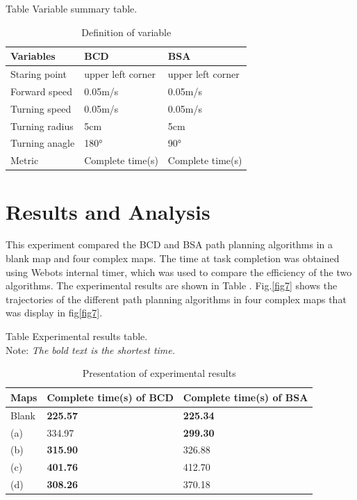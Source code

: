 \documentclass[conference]{IEEEtran}
\begin{document}
Table \uppercase\expandafter{} Variable summary table.
\begin{table}[htbp]
\centering
\setlength{\abovecaptionskip}{0.cm}
\caption{Definition of variable}
\label{Table1}
\begin{tabular}{lll}
\hline
Variables      & BCD               & BSA               \\\hline
Staring point  & upper left corner & upper left corner \\
Forward speed  & 0.05m/s           & 0.05m/s           \\
Turning speed  & 0.05m/s           & 0.05m/s           \\
Turning radius & 5cm               & 5cm               \\
Turning anagle & 180°              & 90°               \\
Metric         & Complete time(s)  & Complete time(s)  \\\hline
\end{tabular}
\end{table}


\section{Results and Analysis}

This experiment compared the BCD and BSA path planning algorithms in a blank map and four complex maps. The time at task completion was obtained using Webots internal timer, which was used to compare the efficiency of the two algorithms. The experimental results are shown in Table \uppercase\expandafter{}. Fig.\ref{fig7} shows the trajectories of the different path planning algorithms in four complex maps that was display in fig\ref{fig7}. 

Table \uppercase\expandafter{} Experimental results table.
\\
Note: \textit{The bold text is the shortest time.}
\begin{table}[htbp]
\centering
\setlength{\abovecaptionskip}{0.cm}
\caption{Presentation of experimental results}
\label{Table1}
\begin{tabular}{lll}
\hline
Maps  & Complete time(s) of BCD & Complete time(s) of BSA \\\hline
Blank & \textbf{225.57}         & \textbf{225.34}                  \\
(a)   & 334.97                  & \textbf{299.30}                  \\
(b)   & \textbf{315.90}                  & 326.88                  \\
(c)   & \textbf{401.76}                  & 412.70                  \\
(d)   & \textbf{308.26}                  & 370.18                  \\\hline
\end{tabular}\\
\end{table}
\end{document}
